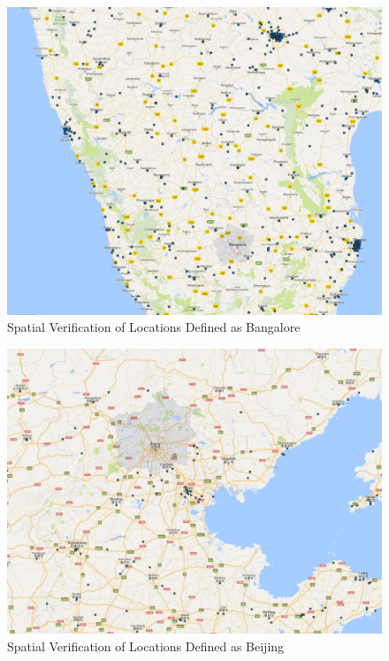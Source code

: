 \documentclass[12pt]{article}
\begin{document}
\begin{figure}[h]
\begin{centering}
  \includegraphics[width=\textwidth]{BangalorePrime}
  \caption{Spatial Verification of Locations Defined as Bangalore}
   \label{fig:BangalorePrime}
\end{centering}
\end{figure}

\begin{figure}[h]
\begin{centering}
  \includegraphics[width=\textwidth]{BeijingPrime}
  \caption{Spatial Verification of Locations Defined as Beijing}
   \label{fig:BeijingPrime}
\end{centering}
\end{figure}
\end{document}
